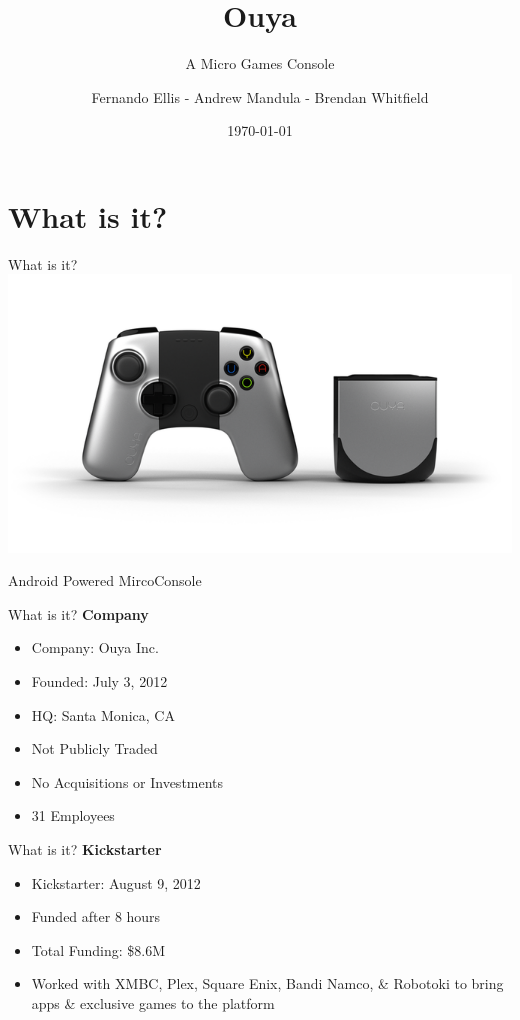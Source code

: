 \documentclass[10pt, compress]{beamer}
\title{Ouya}
\subtitle{A Micro Games Console}
\date{\today}
\author{Fernando Ellis - Andrew Mandula - Brendan Whitfield}
\institute{Futuere}
\begin{document}
\maketitle

\section{What is it?}

    \begin{frame}{What is it?}
    \includegraphics[width=\textwidth]{images/Ouya.png}
    \\ \begin{center}Android Powered MircoConsole \end{center}
    \end{frame}
    
    \begin{frame}{What is it?}
    \textbf{Company}
    \begin{itemize}
    \item Company: Ouya Inc.
    \item Founded: July 3, 2012
    \item HQ: Santa Monica, CA
    \item Not Publicly Traded
    \item No Acquisitions or Investments
    \item 31 Employees
    \end{itemize}
    \end{frame}
    
    \begin{frame}{What is it?}
    \textbf{Kickstarter}
    \begin{itemize}
    \item Kickstarter: August 9, 2012
    \item Funded after 8 hours
    \item Total Funding: \$8.6M
    \item Worked with XMBC, Plex, Square Enix, Bandi Namco, \& Robotoki to bring apps \& exclusive games to the platform
    \end{itemize}
    \end{frame}
    
\end{document}
